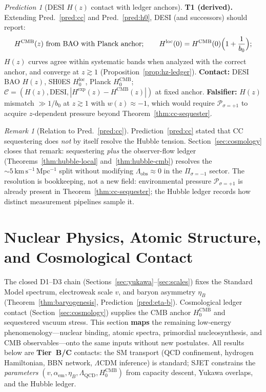 \documentclass[11pt]{article}
\theoremstyle{plain}
\theoremstyle{definition}
\theoremstyle{remark}
\newtheorem{remark}[theorem]{Remark}
\newtheorem{prediction}[theorem]{Prediction}
\numberwithin{equation}{section}
\begin{document}
\begin{prediction}[DESI $H(z)$ contact with ledger anchors]\label{pred:hz}
\textbf{T1 (derived).} Extending Pred.~\ref{pred:cc} and Pred.~\ref{pred:h0},
DESI (and successors) should report:
\begin{equation}\label{eq:pred-hz}
  H^{\mathrm{CMB}}(z)\ \text{from BAO with Planck anchor};
  \qquad
  H^{\mathrm{loc}}(0)=H^{\mathrm{CMB}}(0)\Bigl(1+\frac{1}{b_0}\Bigr);
\end{equation}
$H(z)$ curves agree within systematic bands when analyzed with the correct
anchor, and converge at $z\gtrsim 1$ (Proposition~\ref{prop:hz-ledger}).
\textbf{Contact:} DESI BAO $H(z)$, SH0ES $H_0^{\mathrm{loc}}$,
Planck $H_0^{\mathrm{CMB}}$; $\mathcal{C}=(H(z),\mathrm{DESI},
|H^{\mathrm{exp}}(z)-H^{\mathrm{CMB}}(z)|)$ at fixed anchor.
\textbf{Falsifier:} $H(z)$ mismatch $\gg 1/b_0$ at $z\gtrsim 1$ with
$w(z)\approx -1$, which would require $\mathcal{P}_{\sigma=+1}$ to acquire
$z$-dependent pressure beyond Theorem~\ref{thm:cc-sequester}.
\end{prediction}

\begin{remark}[Relation to Pred.~\ref{pred:cc}]
Prediction~\ref{pred:cc} stated that CC sequestering does \emph{not} by itself
resolve the Hubble tension. Section~\ref{sec:cosmology} closes that remark:
sequestering \emph{plus} the observer-flow ledger (Theorems~\ref{thm:hubble-local}
and~\ref{thm:hubble-cmb}) resolves the $\sim 5\,\mathrm{km\,s^{-1}\,Mpc^{-1}}$
split without modifying $\Lambda_{\mathrm{obs}}\approx 0$ in the
$\Pi_{\sigma=-1}$ sector. The resolution is bookkeeping, not a new field:
environmental pressure $\mathcal{P}_{\sigma=+1}$ is already present in
Theorem~\ref{thm:cc-sequester}; the Hubble ledger records how distinct
measurement pipelines sample it.
\end{remark}%
\section{Nuclear Physics, Atomic Structure, and Cosmological Contact}
\label{sec:nuclear-atomic-cosmo}

The closed D1--D3 chain (Sections~\ref{sec:yukawa}--\ref{sec:scales}) fixes
the Standard Model spectrum, electroweak scale $v$, and baryon asymmetry
$\eta_B$ (Theorem~\ref{thm:baryogenesis}, Prediction~\ref{pred:eta-b}).
Cosmological ledger contact (Section~\ref{sec:cosmology}) supplies the CMB
anchor $H_0^{\mathrm{CMB}}$ and sequestered vacuum stress. This section
\textbf{maps} the remaining low-energy phenomenology---nuclear binding,
atomic spectra, primordial nucleosynthesis, and CMB observables---onto the
same inputs without new postulates. All results below are \textbf{Tier~B/C}
contacts: the SM transport (QCD confinement, hydrogen Hamiltonian, BBN network,
$\Lambda$CDM inference) is standard; SJET constrains the \emph{parameters}
$(v,\alpha_{\mathrm{em}},\eta_B,\Lambda_{\mathrm{QCD}},H_0^{\mathrm{CMB}})$
from capacity descent, Yukawa overlaps, and the Hubble ledger.
\end{document}
